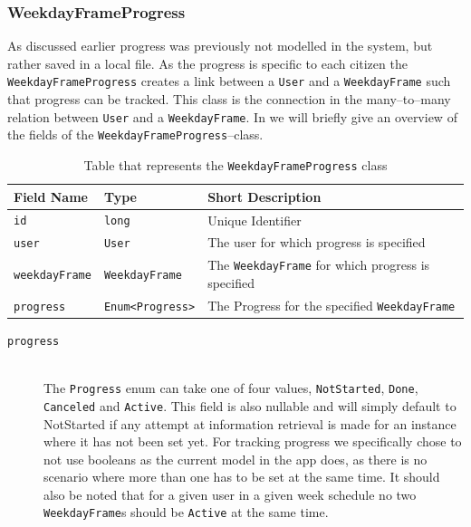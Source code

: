 \subsubsection{WeekdayFrameProgress}\label{subsubsec:weekdayframeprogress}
As discussed earlier progress was previously not modelled in the system, but rather saved in a local file.
As the progress is specific to each citizen the \texttt{WeekdayFrameProgress} creates a link between a \texttt{User} and a \texttt{WeekdayFrame} such that progress can be tracked.
This class is the connection in the many--to--many relation between \texttt{User} and a \texttt{WeekdayFrame}.
In  we will briefly give an overview of the fields of the \texttt{WeekdayFrameProgress}--class.

\begin{table}[H]
    \footnotesize
    \centering
    \begin{tabularx}{\textwidth}{ l l X }
        \textbf{Field Name}   & \textbf{Type}                               & \textbf{Short Description}                                \\
        \midrule
        \texttt{id}           & \texttt{long}                               & Unique Identifier                                         \\
        \texttt{user}         & \texttt{User}                               & The user for which progress is specified                  \\
        \texttt{weekdayFrame} & \texttt{WeekdayFrame}                       & The \texttt{WeekdayFrame} for which progress is specified \\
        \texttt{progress}     & \texttt{Enum\textless Progress\textgreater} & The Progress for the specified \texttt{WeekdayFrame}
    \end{tabularx}
    \caption{Table that represents the \texttt{WeekdayFrameProgress} class}
    \label{tbl:WeekdayFrameProgress}
\end{table}

\begin{description}
    \item [\texttt{progress}] \hfill \\
    The \texttt{Progress} enum can take one of four values, \texttt{NotStarted}, \texttt{Done}, \texttt{Canceled} and \texttt{Active}.
    This field is also nullable and will simply default to NotStarted if any attempt at information retrieval is made for an instance where it has not been set yet.
    For tracking progress we specifically chose to not use booleans as the current model in the app does, as there is no scenario where more than one has to be set at the same time.
    It should also be noted that for a given user in a given week schedule no two \texttt{WeekdayFrame}s should be \texttt{Active} at the same time.
\end{description}

